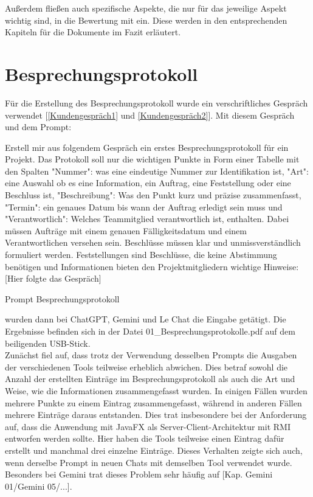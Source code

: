 Außerdem fließen auch spezifische Aspekte, die nur für das jeweilige Aspekt wichtig sind, in die Bewertung mit ein. 
Diese werden in den entsprechenden Kapiteln für die Dokumente im Fazit erläutert.


\section{Besprechungsprotokoll}  \label{CompBesprechungsprotokoll}

Für die Erstellung des Besprechungsprotokoll wurde ein verschriftliches Gespräch verwendet [\autoref{Kundengespräch1} 
und \autoref{Kundengespräch2}]. Mit diesem Gespräch und dem Prompt:
    
\begin{prompt}[H]
    \begin{tcolorbox}[colback=gray!20, colframe=gray!20, boxrule=0pt, sharp corners] 
        Erstell mir aus folgendem Gespräch ein erstes Besprechungsprotokoll für ein Projekt. Das Protokoll soll nur 
        die wichtigen Punkte in Form einer Tabelle mit den Spalten "Nummer": was eine eindeutige Nummer zur 
        Identifikation ist, "Art": eine Auswahl ob es eine Information, ein Auftrag, eine Feststellung oder eine 
        Beschluss ist, "Beschreibung": Was den Punkt kurz und präzise zusammenfasst, "Termin": ein genaues Datum bis 
        wann der Auftrag erledigt sein muss und "Verantwortlich": Welches Teammitglied verantwortlich ist, enthalten. 
        Dabei müssen Aufträge mit einem genauen Fälligkeitsdatum und einem Verantwortlichen versehen sein. Beschlüsse 
        müssen klar und unmissverständlich formuliert werden. Feststellungen sind Beschlüsse, die keine Abstimmung 
        benötigen und Informationen bieten den Projektmitgliedern wichtige Hinweise: 
        [Hier folgte das Gespräch]
        \vfill
    \end{tcolorbox}
    \caption{Prompt Besprechungsprotokoll}
    \label{Prompt Besprechungsprotokoll}
\end{prompt}

wurden dann bei ChatGPT, Gemini und Le Chat die Eingabe getätigt. Die Ergebnisse befinden sich in der Datei 01\_Besprechungsprotokolle.pdf 
auf dem beiligenden USB-Stick.\\

Zunächst fiel auf, dass trotz der Verwendung desselben Prompts die Ausgaben der verschiedenen Tools teilweise erheblich abwichen. 
Dies betraf sowohl die Anzahl der erstellten Einträge im Besprechungsprotokoll als auch die Art und Weise, wie die Informationen 
zusammengefasst wurden. In einigen Fällen wurden mehrere Punkte zu einem Eintrag zusammengefasst, während in anderen Fällen mehrere 
Einträge daraus entstanden. Dies trat insbesondere bei der Anforderung auf, dass die Anwendung mit JavaFX als Server-Client-Architektur 
mit RMI entworfen werden sollte. Hier haben die Tools teilweise einen Eintrag dafür erstellt und manchmal drei einzelne Einträge. 
Dieses Verhalten zeigte sich auch, wenn derselbe Prompt in neuen Chats mit demselben Tool verwendet wurde. Besonders bei Gemini trat 
dieses Problem sehr häufig auf [Kap. Gemini 01/Gemini 05/...].\\

